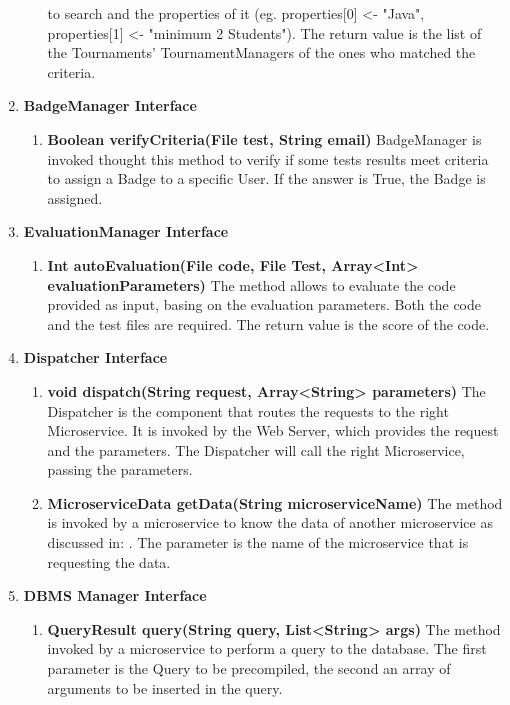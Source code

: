 \begin{enumerate}
\begin{enumerate}[label=$\bullet$]
            to search and the properties of it (eg. properties[0] <- "Java", properties[1] <- "minimum 2 Students"). The return value is the list of the Tournaments' TournamentManagers of the ones who matched the criteria.
        \end{enumerate}
    \item \textbf{BadgeManager Interface}
        \begin{enumerate}[label=$\bullet$]
            \item \textbf{Boolean verifyCriteria(File test, String email)} BadgeManager is invoked thought this method to verify if some tests results meet criteria to assign a Badge to a specific User. If the answer is True, the Badge
            is assigned.
        \end{enumerate}
    \item \textbf{EvaluationManager Interface}
        \begin{enumerate}[label=$\bullet$]
            \item \textbf{Int autoEvaluation(File code, File Test, Array<Int> evaluationParameters)} The method allows to evaluate the code provided as input, basing on the evaluation parameters. Both the code and the test files are
            required. The return value is the score of the code.
        \end{enumerate}
    \item \textbf{Dispatcher Interface}
        \begin{enumerate}[label=$\bullet$]
            \item \textbf{void dispatch(String request, Array<String> parameters)} The Dispatcher is the component that routes the requests to the right Microservice. It is invoked by the Web Server, which provides the request and the 
            parameters. The Dispatcher will call the right Microservice, passing the parameters.
            \item \textbf{MicroserviceData getData(String microserviceName)} \label{meth:dispGetData}The method is invoked by a microservice to know the data of another microservice as discussed in: . The parameter is the name of the microservice that is requesting the data.
        \end{enumerate}
    \item \textbf{DBMS Manager Interface}
        \begin{enumerate} [label=$\bullet$]
            \item \textbf{QueryResult query(String query, List<String> args)} The method invoked by a microservice to perform a query to the database. The first parameter is the Query to be precompiled, the second an array of arguments to be inserted in the query.
    \end{enumerate}
\end{enumerate}
